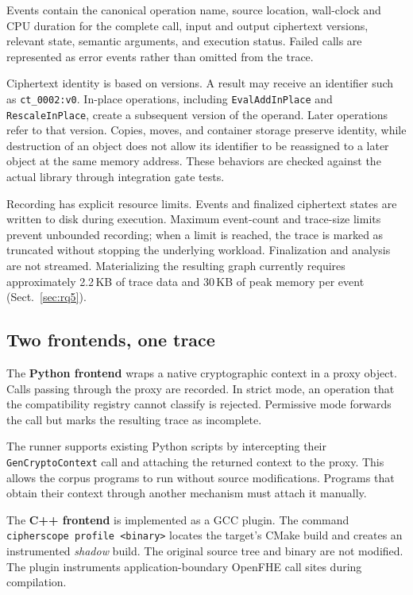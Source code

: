 \documentclass[pdflatex,sn-basic,Numbered,iicol]{sn-jnl}
\begin{document}
Events contain the canonical operation name, source location, wall-clock and
CPU duration for the complete call, input and output ciphertext versions,
relevant state, semantic arguments, and execution status. Failed calls are
represented as error events rather than omitted from the trace.

Ciphertext identity is based on versions. A result may receive an identifier
such as \texttt{ct\_0002:v0}. In-place operations, including
\texttt{EvalAddInPlace} and \texttt{RescaleInPlace}, create a subsequent
version of the operand. Later operations refer to that version. Copies,
moves, and container storage preserve identity, while destruction of an
object does not allow its identifier to be reassigned to a later object at
the same memory address. These behaviors are checked against the actual
library through integration gate tests.

Recording has explicit resource limits. Events and finalized ciphertext
states are written to disk during execution. Maximum event-count and
trace-size limits prevent unbounded recording; when a limit is reached, the
trace is marked as truncated without stopping the underlying workload.
Finalization and analysis are not streamed. Materializing the resulting graph
currently requires approximately 2.2\,KB of trace data and 30\,KB of peak
memory per event (Sect.~\ref{sec:rq5}).

\subsection{Two frontends, one trace}
\label{sec:frontends}

The \textbf{Python frontend} wraps a native cryptographic context in a proxy
object. Calls passing through the proxy are recorded. In strict mode, an
operation that the compatibility registry cannot classify is rejected.
Permissive mode forwards the call but marks the resulting trace as
incomplete.

The runner supports existing Python scripts by intercepting their
\texttt{GenCryptoContext} call and attaching the returned context to the
proxy. This allows the corpus programs to run without source modifications.
Programs that obtain their context through another mechanism must attach it
manually.

The \textbf{C++ frontend} is implemented as a GCC plugin. The command
\texttt{cipherscope profile <binary>} locates the target's CMake build and
creates an instrumented \emph{shadow} build. The original source tree and
binary are not modified. The plugin instruments application-boundary OpenFHE
call sites during compilation.
\end{document}
